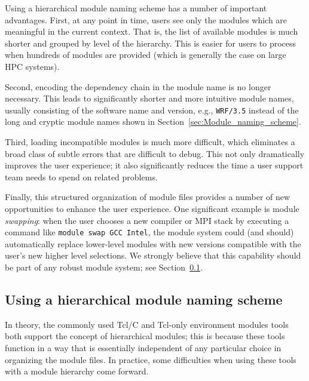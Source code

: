 
Using a hierarchical module naming scheme has a number of important
advantages. First, at any point in time, users see only the
modules which are meaningful in the current context. That is, the list of
available modules is much shorter and grouped by level of the hierarchy. This is easier for users to process when hundreds of modules are
provided (which is generally the case on large HPC systems).

Second, encoding the dependency chain in the module name is no longer
necessary. This leads to significantly shorter and more intuitive
module names, usually consisting of the software name and version, e.g.,
\texttt{\small WRF/3.5} instead of the long and cryptic module names shown in
Section~\ref{sec:Module_naming_scheme}.

Third, loading incompatible modules is much more difficult,
which eliminates a broad class of subtle errors that
are difficult to debug. This not only dramatically improves the user experience; it
also significantly reduces the time a user support team needs to spend on related
problems.

Finally, this structured organization of module files provides
a number of new opportunities to enhance the user experience. One significant
example is module \emph{swapping}: when the user chooses a new compiler or MPI
stack by executing a command like \texttt{\small module swap GCC Intel}, the module
system could (and should) automatically replace lower-level modules with new
versions compatible with the user's new higher level selections.
We strongly believe
that this capability should be part of any robust module system; see
Section~\ref{sec:using_a_hierarchy}.


\subsection{Using a hierarchical module naming scheme}
\label{sec:using_a_hierarchy}

In theory, the commonly used Tcl/C and Tcl-only environment modules tools
both support the concept of hierarchical modules; this is because these tools
function in a way that is essentially independent of any particular choice in
organizing the module files. In practice, some difficulties when using these tools
with a module hierarchy come forward.

